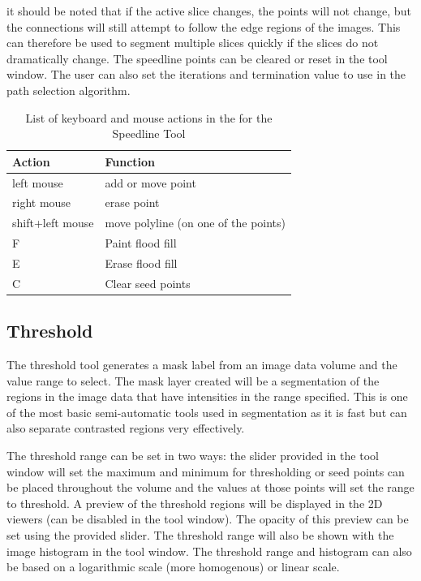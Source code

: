 \documentclass[fleqn,11pt,openany]{book}
\begin{document}
it should be noted that if the active slice changes, the points will not change, but the connections will still attempt to follow the edge regions of the images.  This can therefore be used to segment multiple slices quickly if the slices do not dramatically change.  The speedline points can be cleared or reset in the tool window.  The user can also set the iterations and termination value to use in the path selection algorithm.  

\begin{table}[h!]
\label{tab:speedlinekey}
\caption{List of keyboard and mouse actions in the for the Speedline Tool}
\begin{tabular}{|l|l|}
\hline
{\bf Action} & {\bf Function}\\
\hline 
left mouse & add or move point \\
\hline
right mouse & erase point\\
\hline
shift+left mouse & move polyline (on one of the points)\\
\hline
F & Paint flood fill\\
\hline
E & Erase flood fill\\ 
\hline
C & Clear seed points\\
\hline
\end{tabular}
\end{table}


\subsection{Threshold}

The threshold tool generates a mask label from an image data volume and the value range to select.  The mask layer created will be a segmentation of the regions in the image data that have intensities in the range specified.  This is one of the most basic semi-automatic tools used in segmentation as it is fast but can also separate contrasted regions very effectively.  

The threshold range can be set in two ways: the slider provided in the tool window will set the maximum and minimum for thresholding or seed points can be placed throughout the volume and the values at those points will set the range to threshold. A preview of the threshold regions will be displayed in the 2D viewers (can be disabled in the tool window).   The opacity of this preview can be set using the provided slider.   The threshold range will also be shown with the image histogram in the tool window. The threshold range and histogram can also be based on a logarithmic scale (more homogenous) or linear scale.  
\end{document}
